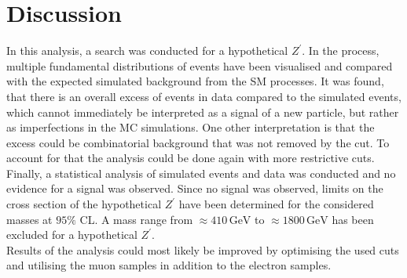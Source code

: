\section{Discussion}
\label{sec:Diskussion}
In this analysis, a search was conducted for a hypothetical $Z^\prime$. In the process, multiple fundamental distributions of events
have been visualised and compared with the expected simulated background from the SM processes. It was found, that
there is an overall excess of events in data compared to the simulated events, which cannot immediately be interpreted as a signal of a
new particle, but rather as imperfections in the MC simulations.
One other interpretation is
that the excess could be combinatorial background that was not removed by the cut. To account for that the analysis could be done again with more restrictive cuts.
Finally, a statistical analysis of
simulated events and data was conducted and no evidence for a signal was observed.
Since no signal was observed, limits on the cross section of the hypothetical $Z^\prime$ have been determined for the 
considered masses at $95\%$ CL.
A mass
range from $\approx 410 \, \si{\giga\eV}$ to $\approx 1800 \, \si{\giga\eV}$ has been excluded for a hypothetical $Z^\prime$.\\
Results of the analysis could most likely be improved by optimising the used cuts and utilising the muon samples in addition to the electron samples. \\
